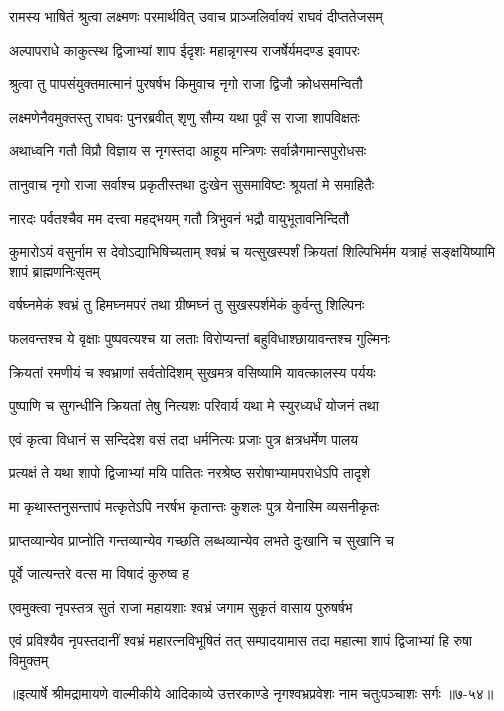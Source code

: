 
\twolineshloka
{रामस्य भाषितं श्रुत्वा लक्ष्मणः परमार्थवित्}
{उवाच प्राञ्जलिर्वाक्यं राघवं दीप्ततेजसम्} %

\twolineshloka
{अल्पापराधे काकुत्स्थ द्विजाभ्यां शाप ईदृशः}
{महान्नृगस्य राजर्षेर्यमदण्ड इवापरः} %

\twolineshloka
{श्रुत्वा तु पापसंयुक्तमात्मानं पुरषर्षभ}
{किमुवाच नृगो राजा द्विजौ क्रोधसमन्वितौ} %

\twolineshloka
{लक्ष्मणेनैवमुक्तस्तु राघवः पुनरब्रवीत्}
{शृणु सौम्य यथा पूर्वं स राजा शापविक्षतः} %

\twolineshloka
{अथाध्वनि गतौ विप्रौ विज्ञाय स नृगस्तदा}
{आहूय मन्त्रिणः सर्वान्नैगमान्सपुरोधसः} %

\twolineshloka
{तानुवाच नृगो राजा सर्वाश्च प्रकृतीस्तथा}
{दुःखेन सुसमाविष्टः श्रूयतां मे समाहितैः} %

\twolineshloka
{नारदः पर्वतश्चैव मम दत्त्वा महद्भयम्}
{गतौ त्रिभुवनं भद्रौ वायुभूतावनिन्दितौ} %

\threelineshloka
{कुमारोऽयं वसुर्नाम स देवोऽद्याभिषिच्यताम्}
{श्वभ्रं च यत्सुखस्पर्शं क्रियतां शिल्पिभिर्मम}
{यत्राहं सङ्क्षयिष्यामि शापं ब्राह्मणनिःसृतम्} %

\twolineshloka
{वर्षघ्नमेकं श्वभ्रं तु हिमघ्नमपरं तथा}
{ग्रीष्मघ्नं तु सुखस्पर्शमेकं कुर्वन्तु शिल्पिनः} %

\twolineshloka
{फलवन्तश्च ये वृक्षाः पुष्पवत्यश्च या लताः}
{विरोप्यन्तां बहुविधाश्छायावन्तश्च गुल्मिनः} %

\twolineshloka
{क्रियतां रमणीयं च श्वभ्राणां सर्वतोदिशम्}
{सुखमत्र वसिष्यामि यावत्कालस्य पर्ययः} %

\twolineshloka
{पुष्पाणि च सुगन्धीनि क्रियतां तेषु नित्यशः}
{परिवार्य यथा मे स्युरध्यर्धं योजनं तथा} %

\twolineshloka
{एवं कृत्वा विधानं स सन्दिदेश वसं तदा}
{धर्मनित्यः प्रजाः पुत्र क्षत्रधर्मेण पालय} %

\twolineshloka
{प्रत्यक्षं ते यथा शापो द्विजाभ्यां मयि पातितः}
{नरश्रेष्ठ सरोषाभ्यामपराधेऽपि तादृशे} %

\twolineshloka
{मा कृथास्तनुसन्तापं मत्कृतेऽपि नरर्षभ}
{कृतान्तः कुशलः पुत्र येनास्मि व्यसनीकृतः} %

\twolineshloka
{प्राप्तव्यान्येव प्राप्नोति गन्तव्यान्येव गच्छति}
{लब्धव्यान्येव लभते दुःखानि च सुखानि च} %

\onelineshloka
{पूर्वे जात्यन्तरे वत्स मा विषादं कुरुष्व ह} %

\twolineshloka
{एवमुक्त्वा नृपस्तत्र सुतं राजा महायशाः}
{श्वभ्रं जगाम सुकृतं वासाय पुरुषर्षभ} %

\twolineshloka
{एवं प्रविश्यैव नृपस्तदानीं श्वभ्रं महारत्नविभूषितं तत्}
{सम्पादयामास तदा महात्मा शापं द्विजाभ्यां हि रुषा विमुक्तम्} %


॥इत्यार्षे श्रीमद्रामायणे वाल्मीकीये आदिकाव्ये उत्तरकाण्डे नृगश्वभ्रप्रवेशः नाम चतुःपञ्चाशः सर्गः ॥७-५४॥
